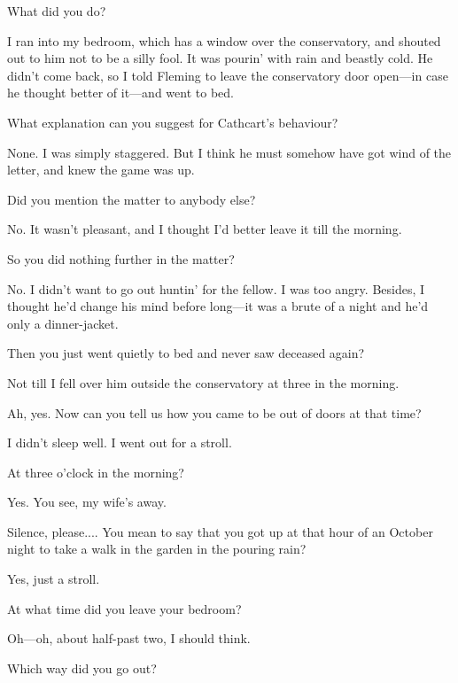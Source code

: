 \begin{dialogue}
 What did you do?

 I ran into my bedroom, which has a window over the conservatory, and shouted out to him not to be a silly fool. It was pourin' with rain and beastly cold. He didn't come back, so I told Fleming to leave the conservatory door open—in case he thought better of it—and went to bed.

 What explanation can you suggest for Cathcart's behaviour?

 None. I was simply staggered. But I think he must somehow have got wind of the letter, and knew the game was up.

 Did you mention the matter to anybody else?

 No. It wasn't pleasant, and I thought I'd better leave it till the morning.

 So you did nothing further in the matter?

 No. I didn't want to go out huntin' for the fellow. I was too angry. Besides, I thought he'd change his mind before long—it was a brute of a night and he'd only a dinner-jacket.

 Then you just went quietly to bed and never saw deceased again?

 Not till I fell over him outside the conservatory at three in the morning.

 Ah, yes. Now can you tell us how you came to be out of doors at that time?

  I didn't sleep well. I went out for a stroll.

 At three o'clock in the morning?

 Yes.  You see, my wife's away. 

 Silence, please.... You mean to say that you got up at that hour of an October night to take a walk in the garden in the pouring rain?

 Yes, just a stroll. 

 At what time did you leave your bedroom?

 Oh—oh, about half-past two, I should think.

 Which way did you go out?


\end{dialogue}
